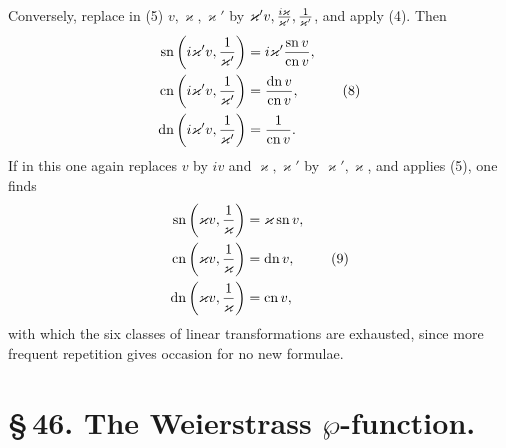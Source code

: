 \documentclass[11pt]{article}
\providecommand{\sn}{\operatorname{sn}}
\providecommand{\cn}{\operatorname{cn}}
\providecommand{\dn}{\operatorname{dn}}
\begin{document}
Conversely, replace in (5) $v,\varkappa,\varkappa'$ by $\varkappa'v,{i\varkappa\over\varkappa'},{1\over\varkappa'}$, and apply (4). Then
\begin{equation}
\begin{aligned}
\sn\left(i\varkappa'v,{1\over\varkappa'}\right)&=i\varkappa'{\sn v\over\cn v},\\
\cn\left(i\varkappa'v,{1\over\varkappa'}\right)&={\dn v\over\cn v},\\
\dn\left(i\varkappa'v,{1\over\varkappa'}\right)&={1\over\cn v}.
\end{aligned}
\tag{8}
\end{equation}
If in this one again replaces $v$ by $iv$ and $\varkappa,\varkappa'$ by $\varkappa',\varkappa$, and applies (5), one finds
\begin{equation}
\begin{aligned}
\sn\left(\varkappa v,{1\over\varkappa}\right)&=\varkappa\sn v,\\
\cn\left(\varkappa v,{1\over\varkappa}\right)&=\dn v,\\
\dn\left(\varkappa v,{1\over\varkappa}\right)&=\cn v,
\end{aligned}
\tag{9}
\end{equation}
with which the six classes of linear transformations are exhausted, since more frequent repetition gives occasion for no new formulae.


\clearpage
\section*{\S\,46. The Weierstrass $\wp$-function.}
\end{document}
